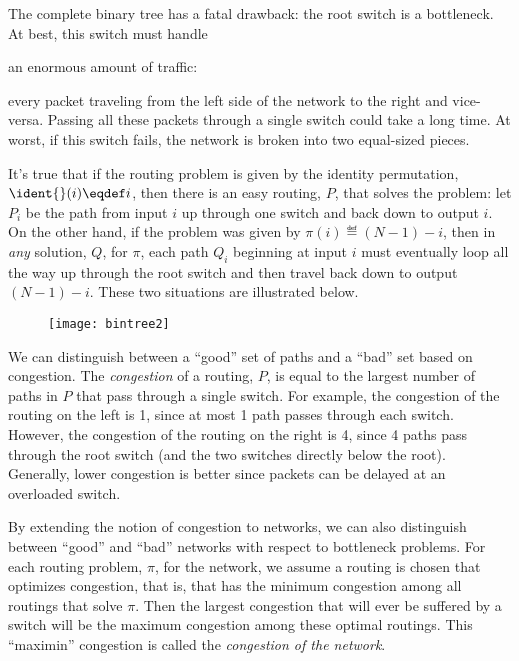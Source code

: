 The complete binary tree has a fatal drawback: the root switch is a
bottleneck.  At best, this switch must handle \begin{editingnotes}
an enormous amount of
traffic:
\end{editingnotes} every packet traveling from the left side of the network to the
right and vice-versa.  Passing all these packets through a single switch
could take a long time.  At worst, if this switch fails, the network is
broken into two equal-sized pieces.

It's true that if the routing problem is given by the identity permutation,
$\ident{}(i) \eqdef i$, then there is an easy routing, $P$, that solves
the problem: let $P_i$ be the path from input $i$ up through one switch
and back down to output $i$.  On the other hand, if the problem was given
by $\pi(i) \eqdef (N - 1) - i$, then in \emph{any} solution, $Q$, for
$\pi$, each path $Q_i$ beginning at input $i$ must eventually loop all
the way up through the root switch and then travel back down to output $(N
- 1) - i$.  These two situations are illustrated below.
\begin{figure}
\texttt{[image: bintree2]}
\end{figure}
We can distinguish between a ``good'' set of paths and a ``bad'' set based
on congestion.  The \emph{congestion}%
%
of a routing, $P$, is equal to the
largest number of paths in $P$ that pass through a single switch.  For
example, the congestion of the routing on the left is 1, since at most 1
path passes through each switch.  However, the congestion of the routing
on the right is 4, since 4 paths pass through the root switch (and the two
switches directly below the root).  Generally, lower congestion is better
since packets can be delayed at an overloaded switch.

By extending the notion of congestion to networks, we can also distinguish
between ``good'' and ``bad'' networks with respect to bottleneck problems.
For each routing problem, $\pi$, for the network, we assume a routing is
chosen that optimizes congestion, that is, that has the minimum congestion
among all routings that solve $\pi$.  Then the largest congestion that
will ever be suffered by a switch will be the maximum congestion among
these optimal routings.  This ``maximin'' congestion is called the
\emph{congestion of the network}.

